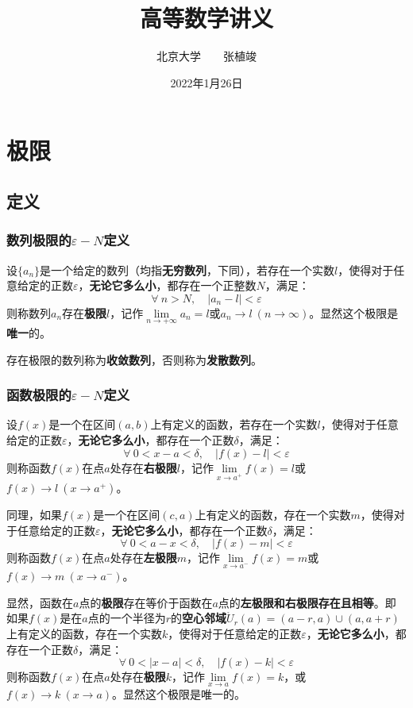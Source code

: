 \documentclass[fontset=none,openany,a4paper]{ctexbook}
\begin{document}
\title{\Huge\textbf{高等数学讲义}}
\author{\kaishu\Large 北京大学\ \ \ \ 张植竣}
\date{\kaishu\Large 2022年1月26日}
\maketitle

\tableofcontents

\chapter{极限}

\section{定义}

\subsection{数列极限的$\varepsilon-N$定义}

设$\{a_n\}$是一个给定的数列（均指\textbf{无穷数列}，下同），若存在一个实数$l$，使得对于任意给定的正数$\varepsilon$，\textbf{无论它多么小}，都存在一个正整数$N$，满足：
\[
\forall\ n>N,\quad |a_n-l|<\varepsilon
\]
则称数列$a_n$存在\textbf{极限}$l$，记作$\lim\limits_{n\to+\infty}a_n=l$或$a_n\to l\ (n\to \infty)$。显然这个极限是\textbf{唯一}的。

存在极限的数列称为\textbf{收敛数列}，否则称为\textbf{发散数列}。

\subsection{函数极限的$\varepsilon-N$定义}

设$f(x)$是一个在区间$(a,b)$上有定义的函数，若存在一个实数$l$，使得对于任意给定的正数$\varepsilon$，\textbf{无论它多么小}，都存在一个正数$\delta$，满足：
\[
\forall\ 0<x-a<\delta,\quad |f(x)-l|<\varepsilon
\]
则称函数$f(x)$在点$a$处存在\textbf{右极限}$l$，记作$\lim\limits_{x\to a^+}f(x)=l$或$f(x)\to l\ (x\to a^+)$。

同理，如果$f(x)$是一个在区间$(c,a)$上有定义的函数，存在一个实数$m$，使得对于任意给定的正数$\varepsilon$，\textbf{无论它多么小}，都存在一个正数$\delta$，满足：
\[
\forall\ 0<a-x<\delta,\quad |f(x)-m|<\varepsilon
\]
则称函数$f(x)$在点$a$处存在\textbf{左极限}$m$，记作$\lim\limits_{x\to a^-}f(x)=m$或$f(x)\to m\ (x\to a^-)$。

显然，函数在$a$点的\textbf{极限}存在等价于函数在$a$点的\textbf{左极限和右极限存在且相等}。即如果$f(x)$是在$a$点的一个半径为$r$的\textbf{空心邻域}$\mathring{U}_r(a)=(a-r,a)\cup(a,a+r)$上有定义的函数，存在一个实数$k$，使得对于任意给定的正数$\varepsilon$，\textbf{无论它多么小}，都存在一个正数$\delta$，满足：
\[
\forall\ 0<|x-a|<\delta,\quad |f(x)-k|<\varepsilon
\]
则称函数$f(x)$在点$a$处存在\textbf{极限}$k$，记作$\lim\limits_{x\to a}f(x)=k$，或$f(x)\to k\ (x\to a)$。显然这个极限是唯一的。
\end{document}
